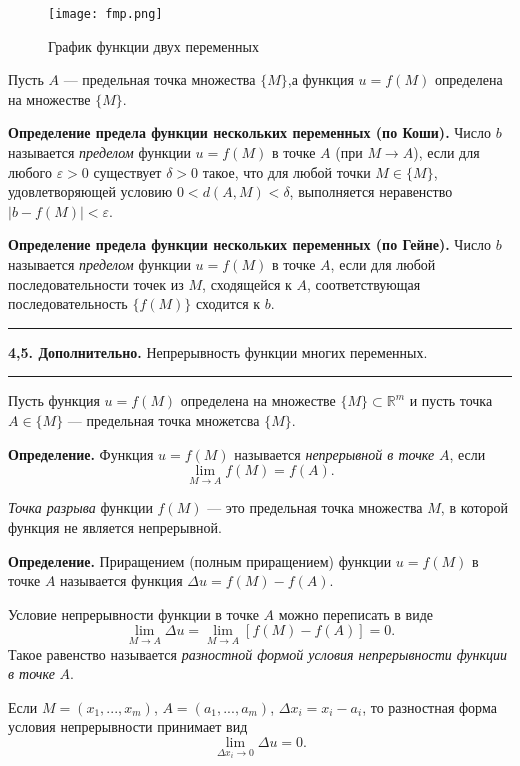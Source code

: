 \documentclass[12pt]{article}
\begin{document}
\begin{figure}
\centering
\texttt{[image: fmp.png]}
\caption{График функции двух переменных}
\label{fig:mpr}
\end{figure}

Пусть $A$ --- предельная точка множества $\{ M \}$,а функция $u = f(M)$ определена на множестве $\{ M \}$.

\textbf{Определение предела функции нескольких переменных (по Коши).} Число $b$ называется \textit{пределом} функции $u=f(M)$ в точке $A$ (при $M \rightarrow A$), если для любого $\varepsilon > 0$ существует $\delta > 0$ такое, что для любой точки $M \in \{ M \}$, удовлетворяющей условию $0 < d(A, M) < \delta$, выполняется неравенство $|b - f(M)| < \varepsilon$.


\textbf{Определение предела функции нескольких переменных (по Гейне).} Число $b$ называется \textit{пределом} функции $u = f(M)$ в точке $A$, если для любой последовательности точек из $M$, сходящейся к $A$, соответствующая последовательность $\{ f(M)\}$ сходится к $b$. \\


\noindent\rule{\textwidth}{1pt}
\textbf{4,5. Дополнительно.} Непрерывность функции многих переменных.

\noindent\rule{\textwidth}{1pt}


Пусть функция $u = f(M)$ определена на множестве $\{ M\} \subset \mathbb{R}^m$ и пусть точка $A \in \{ M \}$ --- предельная точка множетсва $\{ M \}$.

\textbf{Определение.} Функция $u = f(M)$ называется \textit{непрерывной в точке} $A$, если 
$$
	\lim_{M \rightarrow A}f(M) = f(A).
$$


\textit{Точка разрыва} функции $f(M)$ --- это предельная точка множества $M$, в которой функция не является непрерывной. 

\textbf{Определение.} Приращением (полным приращением) функции $u = f(M)$ в точке $A$ называется функция $\Delta u = f(M) - f(A)$.

Условие непрерывности функции в точке $A$ можно переписать в виде
$$
	\lim_{M \rightarrow A}\Delta u = \lim_{M \rightarrow A}[f(M) - f(A)] = 0.
$$
Такое равенство называется\textit{ разностной формой условия непрерывности функции в точке} $A$.


Если $M=(x_1, ..., x_m)$, $A = (a_1, ..., a_m)$, $\Delta x_i = x_i - a_i$, то разностная форма условия непрерывности принимает вид
$$
	\lim_{\Delta x_i \rightarrow 0 } \Delta u = 0.
$$
\end{document}
